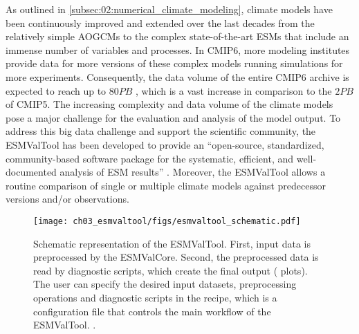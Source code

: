 As outlined in \cref{subsec:02:numerical_climate_modeling}, climate models have
been continuously improved and extended over the last decades from the
relatively simple \acp{AOGCM} to the complex state-of-the-art \acp{ESM} that
include an immense number of variables and processes. In \acs{CMIP}6, more
modeling institutes provide data for more versions of these complex models
running simulations for more experiments. Consequently, the data volume of the
entire \acs{CMIP}6 archive is expected to reach up to $80 \unit{PB}$
\autocite{Balaji2018}, which is a vast increase in comparison to the $2
\unit{PB}$ of \acs{CMIP}5. The increasing complexity and data volume of the
climate models pose a major challenge for the evaluation and analysis of the
model output. To address this big data challenge and support the scientific
community, the \ac{ESMValTool} has been developed to provide an
\enquote{open-source, standardized, community-based software package for the
  systematic, efficient, and well-documented analysis of \ac{ESM} results}
\autocite{Righi2020}. Moreover, the \ac{ESMValTool} allows a routine comparison
of single or multiple climate models against predecessor versions and/or
observations.

\begin{figure}[t]
  \centering
  \texttt{[image: 
    ch03\_esmvaltool/figs/esmvaltool\_schematic.pdf]}
  \caption{Schematic representation of the \acf{ESMValTool}. First, input data
    is preprocessed by the \acf{ESMValCore}. Second, the preprocessed data is
    read by diagnostic scripts, which create the final output (\eg{} plots).
    The user can specify the desired input datasets, preprocessing operations
    and diagnostic scripts in the recipe, which is a configuration file that
    controls the main workflow of the \acs{ESMValTool}.
    .}
  \label{fig:03:esmvaltool_schematic}
\end{figure}

